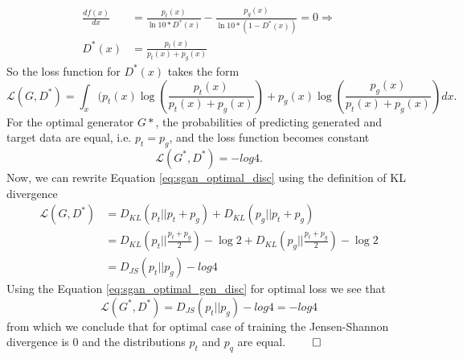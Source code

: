 \begin{equation*}
\begin{split}
  \frac{df(x)}{dx} & = \frac{p_t(x)}{\ln{10} * D^*(x)} - \frac{p_g(x)}{\ln{10} * (1-D^*(x))} = 0 \Rightarrow \\
  D^*(x) & = \frac{p_t(x)}{p_t(x) + p_g(x)}
\end{split}
\end{equation*}
So the loss function for $D^*(x)$ takes the form
\begin{equation}
  \mathcal{L}(G, D^*) = \int_x(p_t(x)\log{\left(\frac{p_t(x)}{p_t(x) + p_g(x)}\right)} + p_g(x)\log{\left(\frac{p_g(x)}{p_t(x) + p_g(x)}\right)}dx.
  \label{eq:sgan_optimal_disc}
\end{equation}
For the optimal generator $G*$, the probabilities of predicting generated and
target data are equal, i.e. $p_t=p_g$, and the loss function becomes constant
\begin{equation}
\mathcal{L}(G^*, D^*) = -log{4}.
\label{eq:sgan_optimal_gen_disc}
\end{equation}
Now, we can rewrite Equation \ref{eq:sgan_optimal_disc} using the definition of KL
divergence
\begin{equation*}
  \begin{split}
    \mathcal{L}(G, D^*) & = D_{KL}(p_t || p_t + p_g) + D_{KL}(p_g || p_t + p_g) \\ 
    & = D_{KL}\left(p_t || \frac{p_t + p_g}{2}\right) - \log{2} + D_{KL}\left(p_g || \frac{p_t + p_g}{2}\right) -\log{2} \\
    & = D_{JS}(p_t || p_g) - log{4}
  \end{split}
\end{equation*}
Using the Equation \ref{eq:sgan_optimal_gen_disc} for optimal loss we see that
\begin{equation*}
  \mathcal{L}(G^*, D^*) = D_{JS}(p_t || p_g) -log{4} =  - log{4}
\end{equation*}
from which we conclude that for optimal case of training the Jensen-Shannon
divergence is $0$ and the distributions $p_t$ and $p_q$ are equal. $\qed$



\let\oldclearpage\clearpage
\let\clearpage\relax
